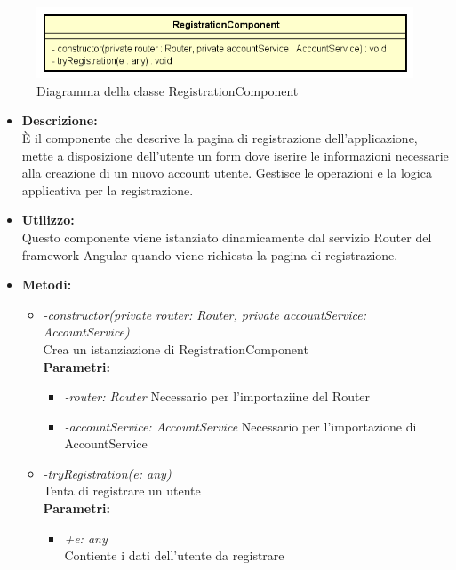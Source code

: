 \begin{figure}[h!]
	\centering
	\includegraphics[scale=0.8]{res/sections/SpecificaFrontEnd/Components/Disegnetti/registration.png}
	\caption{Diagramma della classe RegistrationComponent}
\end{figure}

\begin{itemize}
    \item \textbf{Descrizione:}\\
    È il componente che descrive la pagina di registrazione dell’applicazione, mette a disposizione dell’utente un form dove iserire le informazioni necessarie alla creazione di un nuovo account utente. Gestisce le operazioni e la logica applicativa per la registrazione.
    \item \textbf{Utilizzo:}\\
    Questo componente viene istanziato dinamicamente dal servizio Router del framework Angular quando viene richiesta la pagina di registrazione.
	\item \textbf{Metodi:}
    \begin{itemize}
    	\item \emph{-constructor(private router: Router, private accountService: AccountService)}\\
    	Crea un istanziazione di RegistrationComponent\\
    	\textbf{Parametri:}
    		\begin{itemize}
    			\item \emph{-router: Router}
    			Necessario per l'importaziine del Router
    			\item \emph{-accountService: AccountService}
    			Necessario per l'importazione di AccountService
    		\end{itemize}
    	\item \emph{-tryRegistration(e: any)}\\
    	Tenta di registrare un utente\\
    	\textbf{Parametri:}
    		\begin{itemize}
    			\item \emph{+e: any}\\
    			Contiente i dati dell'utente da registrare
    		\end{itemize}
    \end{itemize}
\end{itemize}
